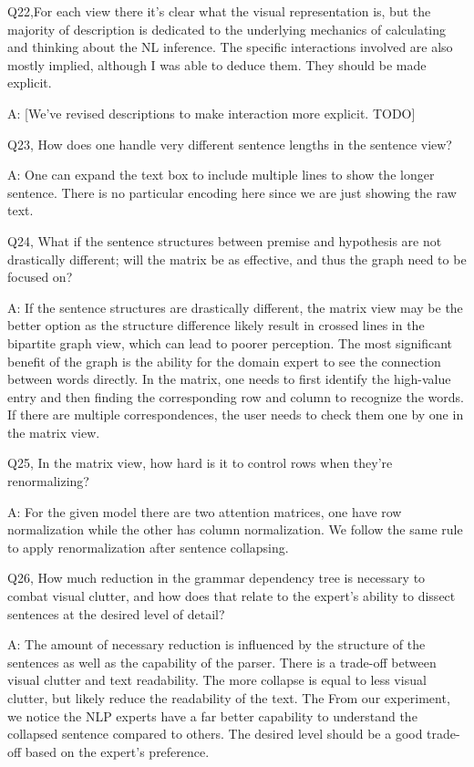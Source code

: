 Q22,For each view there it's clear what the visual representation is, but the majority of description is dedicated to the underlying mechanics of calculating and thinking about the NL inference. The specific interactions involved are also mostly implied, although I was able to deduce them. They should be made explicit.

A: [We've revised descriptions to make interaction more explicit. TODO]


Q23, How does one handle very different sentence lengths in the sentence view?

A: One can expand the text box to include multiple lines to show the longer sentence. There is no particular encoding here since we are just showing the raw text.


Q24, What if the sentence structures between premise and hypothesis are not drastically different; will the matrix be as effective, and thus the graph need to be focused on?

A: If the sentence structures are drastically different, the matrix view may be the better option as the structure difference likely result in crossed lines in the bipartite graph view, which can lead to poorer perception. The most significant benefit of the graph is the ability for the domain expert to see the connection between words directly. In the matrix, one needs to first identify the high-value entry and then finding the corresponding row and column to recognize the words. If there are multiple correspondences, the user needs to check them one by one in the matrix view.


Q25, In the matrix view, how hard is it to control rows when they're renormalizing?

A: For the given model there are two attention matrices, one have row normalization while the other has column normalization. We follow the same rule to apply renormalization after sentence collapsing.

Q26, How much reduction in the grammar dependency tree is necessary to combat visual clutter, and how does that relate to the expert's ability to dissect sentences at the desired level of detail?

A: The amount of necessary reduction is influenced by the structure of the sentences as well as the capability of the parser. There is a trade-off between visual clutter and text readability. The more collapse is equal to less visual clutter, but likely reduce the readability of the text. The From our experiment, we notice the NLP experts have a far better capability to understand the collapsed sentence compared to others. The desired level should be a good trade-off based on the expert's preference.


